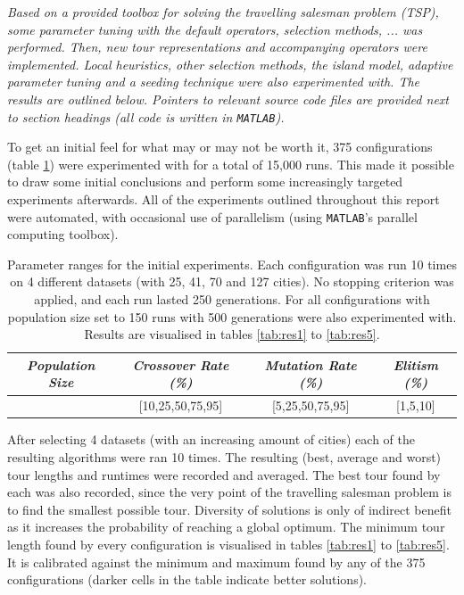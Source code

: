 
\begin{center}
\textit{Based on a provided toolbox for solving the travelling salesman problem (TSP), some parameter tuning with the default operators, selection methods, ... was performed. Then, new tour representations and accompanying operators were implemented. Local heuristics, other selection methods, the island model, adaptive parameter tuning and a seeding technique were also experimented with. The results are outlined below. Pointers to relevant source code files are provided next to section headings (all code is written in \texttt{MATLAB}).}
\end{center}


To get an initial feel for what may or may not be worth it, 375 configurations (table \ref{tab:par1}) were experimented with for a total of 15,000 runs. This made it possible to draw some initial conclusions and perform some increasingly targeted experiments afterwards. All of the experiments outlined throughout this report were automated, with occasional use of parallelism (using \texttt{MATLAB}'s parallel computing toolbox).

\begin{table}[h]
\centering
\begin{tabular}{c|c|c|c}
\textit{Population Size} & \textit{Crossover Rate (\%)} & \textit{Mutation Rate (\%)} & \textit{Elitism (\%)} \\\hline 
[150,300,600] & [10,25,50,75,95] & [5,25,50,75,95] & [1,5,10]
\end{tabular}
\caption{Parameter ranges for the initial experiments. Each configuration was run 10 times on 4 different datasets (with 25, 41, 70 and 127 cities). No stopping criterion was applied, and each run lasted 250 generations. For all configurations with population size set to 150 runs with 500 generations were also experimented with. Results are visualised in tables \ref{tab:res1} to \ref{tab:res5}.}
\label{tab:par1}
\end{table}

\noindent After selecting 4 datasets (with an increasing amount of cities) each of the resulting algorithms were ran 10 times. The resulting (best, average and worst) tour lengths and runtimes were recorded and averaged. The best tour found by each was also recorded, since the very point of the travelling salesman problem is to find the smallest possible tour. Diversity of solutions is only of indirect benefit as it increases the probability of reaching a global optimum. The minimum tour length found by every configuration is visualised in tables \ref{tab:res1} to \ref{tab:res5}. It is calibrated against the minimum and maximum found by any of the 375 configurations (darker cells in the table indicate better solutions).\\

